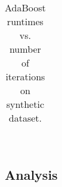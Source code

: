 \begin{table}[!htbp]
\centering
\begin{tabular}{lcc}
\end{tabular}
\caption{AdaBoost runtimes vs. number of iterations on synthetic dataset.}
\label{tab:adaBupa2}
\end{table}

\begin{table}[!htbp]
\centering
\begin{tabular}{lcc}
\end{tabular}
\caption{}
\label{tab:adaSynth}
\end{table}
\subsection{Analysis}
